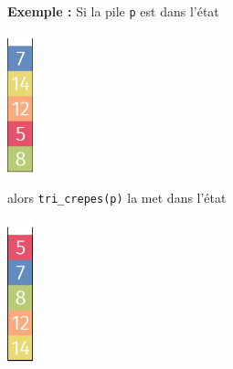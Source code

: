 \documentclass[a4paper,12pt,eval,firamath]{nsi}
\begin{document}
\textbf{Exemple : } Si la pile \texttt{p} est dans l'état
\begin{center}
      \includegraphics[width=0.75cm]{img/pile4.png}
\end{center}
alors \texttt{tri_crepes(p)} la met dans l'état
\begin{center}
      \includegraphics[width=0.75cm]{img/pile5.png}
\end{center}

\end{document}
